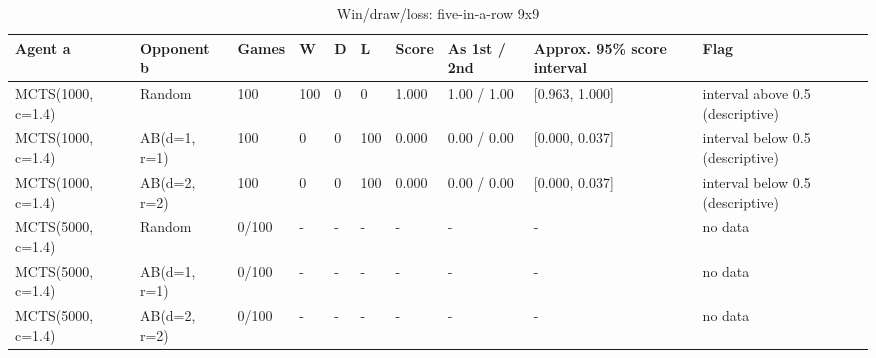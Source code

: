 \begin{table}[!t]
\centering
\caption{Win/draw/loss: five-in-a-row 9x9}
\label{tab:wdl_gomoku9}
\small
\begin{tabular}{llllllllll}
\toprule
Agent a & Opponent b & Games & W & D & L & Score & As 1st / 2nd & Approx. 95\% score interval & Flag \\
\midrule
MCTS(1000, c=1.4) & Random & 100 & 100 & 0 & 0 & 1.000 & 1.00 / 1.00 & [0.963, 1.000] & interval above 0.5 (descriptive) \\
MCTS(1000, c=1.4) & AB(d=1, r=1) & 100 & 0 & 0 & 100 & 0.000 & 0.00 / 0.00 & [0.000, 0.037] & interval below 0.5 (descriptive) \\
MCTS(1000, c=1.4) & AB(d=2, r=2) & 100 & 0 & 0 & 100 & 0.000 & 0.00 / 0.00 & [0.000, 0.037] & interval below 0.5 (descriptive) \\
MCTS(5000, c=1.4) & Random & 0/100 & - & - & - & - & - & - & no data \\
MCTS(5000, c=1.4) & AB(d=1, r=1) & 0/100 & - & - & - & - & - & - & no data \\
MCTS(5000, c=1.4) & AB(d=2, r=2) & 0/100 & - & - & - & - & - & - & no data \\
\bottomrule
\end{tabular}
\end{table}
